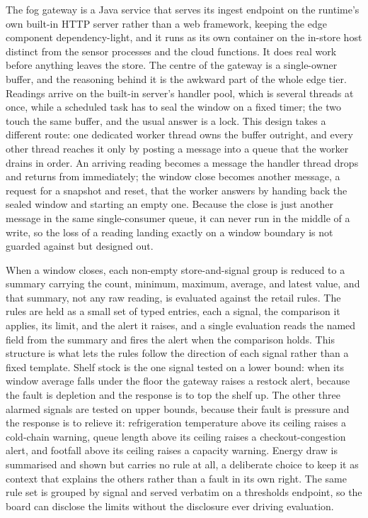 \documentclass[conference]{IEEEtran}
\begin{document}
The fog gateway is a Java service that serves its ingest endpoint on the runtime's own built-in HTTP server rather than a web framework, keeping the edge component dependency-light, and it runs as its own container on the in-store host distinct from the sensor processes and the cloud functions. It does real work before anything leaves the store. The centre of the gateway is a single-owner buffer, and the reasoning behind it is the awkward part of the whole edge tier. Readings arrive on the built-in server's handler pool, which is several threads at once, while a scheduled task has to seal the window on a fixed timer; the two touch the same buffer, and the usual answer is a lock. This design takes a different route: one dedicated worker thread owns the buffer outright, and every other thread reaches it only by posting a message into a queue that the worker drains in order. An arriving reading becomes a message the handler thread drops and returns from immediately; the window close becomes another message, a request for a snapshot and reset, that the worker answers by handing back the sealed window and starting an empty one. Because the close is just another message in the same single-consumer queue, it can never run in the middle of a write, so the loss of a reading landing exactly on a window boundary is not guarded against but designed out.

When a window closes, each non-empty store-and-signal group is reduced to a summary carrying the count, minimum, maximum, average, and latest value, and that summary, not any raw reading, is evaluated against the retail rules. The rules are held as a small set of typed entries, each a signal, the comparison it applies, its limit, and the alert it raises, and a single evaluation reads the named field from the summary and fires the alert when the comparison holds. This structure is what lets the rules follow the direction of each signal rather than a fixed template. Shelf stock is the one signal tested on a lower bound: when its window average falls under the floor the gateway raises a restock alert, because the fault is depletion and the response is to top the shelf up. The other three alarmed signals are tested on upper bounds, because their fault is pressure and the response is to relieve it: refrigeration temperature above its ceiling raises a cold-chain warning, queue length above its ceiling raises a checkout-congestion alert, and footfall above its ceiling raises a capacity warning. Energy draw is summarised and shown but carries no rule at all, a deliberate choice to keep it as context that explains the others rather than a fault in its own right. The same rule set is grouped by signal and served verbatim on a thresholds endpoint, so the board can disclose the limits without the disclosure ever driving evaluation.
\end{document}
